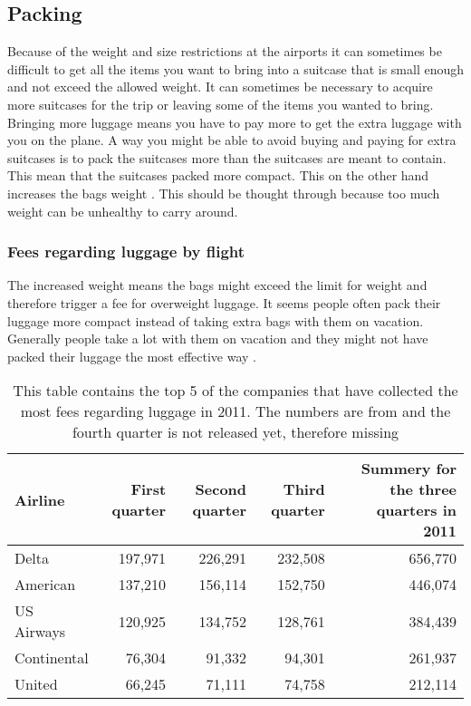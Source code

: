 \subsection{Packing}

Because of the weight and size restrictions at the airports it can sometimes be difficult to get all the items you want to bring into a suitcase that is small enough and not exceed the allowed weight. It can sometimes be necessary to acquire more suitcases for the trip or leaving some of the items you wanted to bring. 
Bringing more luggage means you have to pay more to get the extra luggage with you on the plane. A way you might be able to avoid buying and paying for extra suitcases is to pack the suitcases more than the suitcases are meant to contain. This mean that the suitcases packed more compact. This on the other hand increases the bags weight \citep{altombag}. This should be thought through because too much weight can be unhealthy to carry around.

\subsubsection{Fees regarding luggage by flight}
\label{sec:overweight}
The increased weight means the bags might exceed the limit for weight and therefore trigger a fee for overweight luggage.
It seems people often pack their luggage more compact instead of taking extra bags with them on vacation. Generally people take a lot with them on vacation and they might not have packed their luggage the most effective way \citep{airstat}.

\begin{table}[H]
\begin{tabular}{| l | r | r | r | r |}
\hline
Airline &  First quarter & Second quarter & Third quarter & Summery for the three quarters in 2011 \\ \hline
Delta & 197,971 & 226,291 & 232,508 & 656,770 \\ \hline
American & 137,210 & 156,114 & 152,750 & 446,074 \\ \hline
US Airways & 120,925 & 134,752 & 128,761 & 384,439 \\ \hline
Continental & 76,304 & 91,332 & 94,301 & 261,937\\ \hline
United & 66,245 & 71,111 & 74,758 & 212,114 \\ \hline
\end{tabular}
\caption{This table contains the top 5 of the companies that have collected the most fees regarding luggage in 2011. The numbers are from \citep{airstat} and the fourth quarter is not released yet, therefore missing}
\label{tab:airlinefees}
\end{table}

